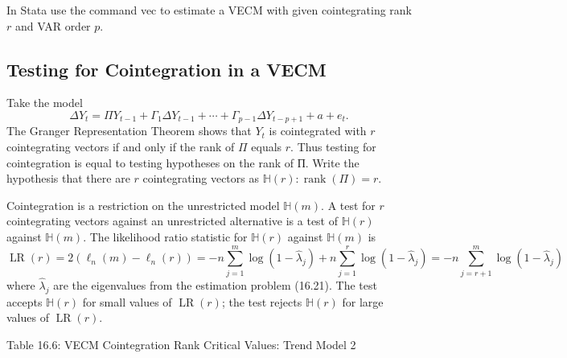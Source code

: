 \documentclass[10pt]{article}
\begin{document}
In Stata use the command vec to estimate a VECM with given cointegrating rank $r$ and VAR order $p$.

\subsection{Testing for Cointegration in a VECM}
Take the model
$$
\Delta Y_{t}=\Pi Y_{t-1}+\Gamma_{1} \Delta Y_{t-1}+\cdots+\Gamma_{p-1} \Delta Y_{t-p+1}+a+e_{t} .
$$
The Granger Representation Theorem shows that $Y_{t}$ is cointegrated with $r$ cointegrating vectors if and only if the rank of $\Pi$ equals $r$. Thus testing for cointegration is equal to testing hypotheses on the rank of П. Write the hypothesis that there are $r$ cointegrating vectors as $\mathbb{H}(r): \operatorname{rank}(\Pi)=r$.

Cointegration is a restriction on the unrestricted model $\mathbb{H}(m)$. A test for $r$ cointegrating vectors against an unrestricted alternative is a test of $\mathbb{H}(r)$ against $\mathbb{H}(m)$. The likelihood ratio statistic for $\mathbb{H}(r)$ against $\mathbb{H}(m)$ is
$$
\operatorname{LR}(r)=2\left(\ell_{n}(m)-\ell_{n}(r)\right)=-n \sum_{j=1}^{m} \log \left(1-\hat{\lambda}_{j}\right)+n \sum_{j=1}^{r} \log \left(1-\hat{\lambda}_{j}\right)=-n \sum_{j=r+1}^{m} \log \left(1-\hat{\lambda}_{j}\right)
$$
where $\hat{\lambda}_{j}$ are the eigenvalues from the estimation problem (16.21). The test accepts $\mathbb{H}(r)$ for small values of $\operatorname{LR}(r)$; the test rejects $\mathbb{H}(r)$ for large values of $\operatorname{LR}(r)$.

Table 16.6: VECM Cointegration Rank Critical Values: Trend Model 2
\end{document}
